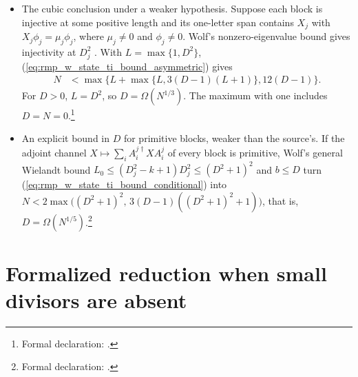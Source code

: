 \documentclass{article}
\begin{document}
\begin{itemize}
    \item The cubic conclusion under a weaker hypothesis. Suppose each
          block is injective at some positive length and its one-letter span
          contains $X_j$ with $X_j\phi_j=\mu_j\phi_j$, where $\mu_j\ne0$ and
          $\phi_j\ne0$. Wolf's nonzero-eigenvalue bound gives injectivity at
          $D_j^2$ \cite[Theorem~6.9(3)]{Wolf2012Quantum}. With $L=\max\{1,D^2\}$,
          (\ref{eq:rmp_w_state_ti_bound_asymmetric}) gives
          \begin{align}
              N & <\max\bigl\{L+\max\{L,3(D-1)(L+1)\},12(D-1)\bigr\}.
              \label{eq:rmp_w_state_ti_bound_eigenvalue}
          \end{align}
          For $D>0$, $L=D^2$, so $D=\Omega(N^{1/3})$. The maximum with one
          includes $D=N=0$.\footnote{Formal declaration:
              .}

    \item An explicit bound in $D$ for primitive blocks, weaker than the
          source's. If the adjoint
          channel $X\mapsto\sum_iA^{j\dagger}_iXA^j_i$ of every block is primitive,
          Wolf's general Wielandt bound $L_0\leq(D_j^2-k+1)D_j^2\leq(D^2+1)^2$
          \cite{Sanz2010Quantum,Wolf2012Quantum} and $b\leq D$ turn
          (\ref{eq:rmp_w_state_ti_bound_conditional}) into
          $N<2\max\bigl((D^2+1)^2,\,3(D-1)((D^2+1)^2+1)\bigr)$, that is,
          $D=\Omega(N^{1/5})$.\footnote{Formal declaration:
              .}
\end{itemize}

\section{Formalized reduction when small divisors are absent}
\end{document}
